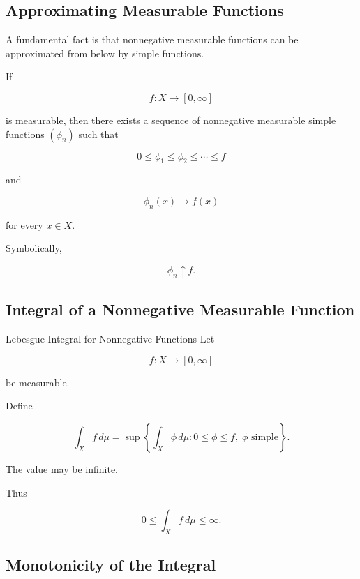 \subsection{Approximating Measurable Functions}
\label{subsec:simple-approximation}

A fundamental fact is that nonnegative measurable functions can be
approximated from below by simple functions.

\begin{theorem}
If

\[
f:X\to[0,\infty]
\]

is measurable, then there exists a sequence of nonnegative measurable
simple functions \((\phi_n)\) such that

\[
\boxed{
0\leq\phi_1\leq\phi_2\leq\cdots\leq f
}
\]

and

\[
\boxed{
\phi_n(x)\to f(x)
}
\]

for every \(x\in X\).
\end{theorem}

Symbolically,

\[
\boxed{
\phi_n\uparrow f.
}
\]

\subsection{Integral of a Nonnegative Measurable Function}
\label{subsec:nonnegative-lebesgue-integral}

\begin{definitionbox}{Lebesgue Integral for Nonnegative Functions}
Let

\[
f:X\to[0,\infty]
\]

be measurable.

Define

\[
\boxed{
\int_X f\,d\mu
=
\sup
\left\{
\int_X\phi\,d\mu:
0\leq\phi\leq f,\;
\phi\text{ simple}
\right\}.
}
\]
\end{definitionbox}

The value may be infinite.

Thus

\[
\boxed{
0\leq
\int_X f\,d\mu
\leq\infty.
}
\]

\subsection{Monotonicity of the Integral}
\label{subsec:monotonicity-lebesgue-integral}

